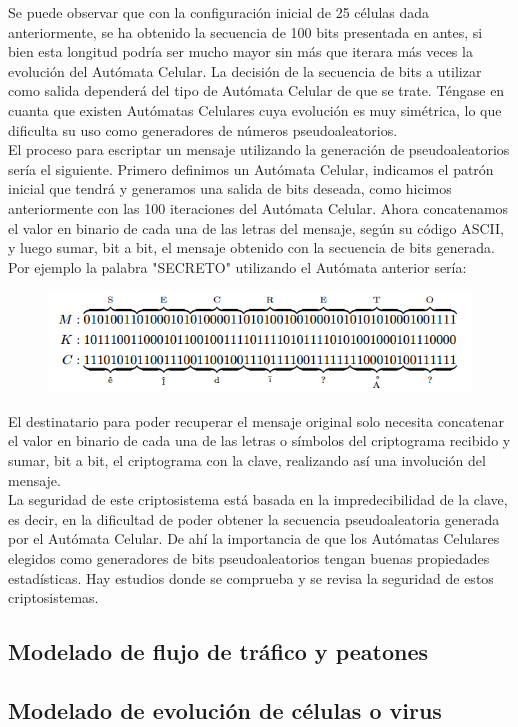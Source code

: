 Se puede observar que con la configuración inicial de 25 células dada anteriormente, se ha obtenido la secuencia de 100 bits presentada en antes, si bien esta longitud podría ser mucho mayor sin más que iterara más veces la evolución del Autómata Celular. La decisión de la secuencia de bits a utilizar como salida dependerá del tipo de Autómata Celular de que se trate. Téngase en cuanta que existen Autómatas Celulares cuya evolución es muy simétrica, lo que dificulta su uso como generadores de números pseudoaleatorios.\\

El proceso para escriptar un mensaje utilizando la generación de pseudoaleatorios sería el siguiente. Primero definimos un Autómata Celular, indicamos el patrón inicial que tendrá y generamos una salida de bits deseada, como hicimos anteriormente con las 100 iteraciones del Autómata Celular. Ahora concatenamos el valor en binario de cada una de las letras del mensaje, según su código ASCII, y luego sumar, bit a bit, el mensaje obtenido con la secuencia de bits generada. Por ejemplo la palabra "SECRETO" utilizando el Autómata anterior sería:

\begin{figure}[H]
\centering
\includegraphics[scale=0.7]{imagenes/secreto.png}
\end{figure}

El destinatario para poder recuperar el mensaje original solo necesita concatenar el valor en binario de cada una de las letras o símbolos del criptograma recibido y sumar, bit a bit, el criptograma con la clave, realizando así una involución del mensaje.\\

La seguridad de este criptosistema está basada en la impredecibilidad de la clave, es decir, en la dificultad de poder obtener la secuencia pseudoaleatoria generada por el Autómata Celular. De ahí la importancia de que los Autómatas Celulares elegidos como generadores de bits pseudoaleatorios tengan buenas propiedades estadísticas. Hay estudios donde se comprueba y se revisa la seguridad de estos criptosistemas.\\



\subsection{Modelado de flujo de tráfico y peatones}

\subsection{Modelado de evolución de células o virus}







